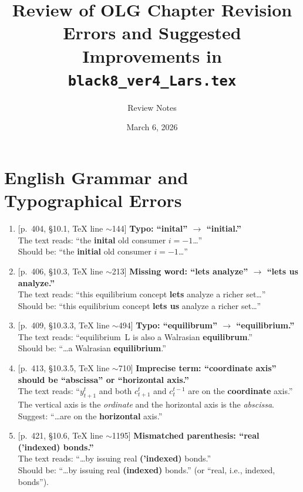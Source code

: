 \documentclass[11pt]{article}
\title{Review of OLG Chapter Revision\\
\large Errors and Suggested Improvements in \texttt{black8\_ver4\_Lars.tex}}
\author{Review Notes}
\date{March 6, 2026}
\newcommand{\Err}[1]{\textbf{\color{red}#1}}
\newcommand{\Fix}[1]{\textbf{\color{green!50!black}#1}}
\newcommand{\loc}[1]{\textsf{\small [#1]}}
\begin{document}
\maketitle

\tableofcontents
\bigskip

\section{English Grammar and Typographical Errors}

\begin{enumerate}[label=\textbf{G\arabic*.}, leftmargin=2em]

\item \loc{p.~404, \S10.1, TeX line $\sim$144}
\textbf{Typo: ``inital'' $\to$ ``initial.''}\\
The text reads: ``the \Err{inital} old consumer $i=-1$\ldots''\\
Should be: ``the \Fix{initial} old consumer $i=-1$\ldots''

\item \loc{p.~406, \S10.3, TeX line $\sim$213}
\textbf{Missing word: ``lets analyze'' $\to$ ``lets us analyze.''}\\
The text reads: ``this equilibrium concept \Err{lets} analyze a richer set\ldots''\\
Should be: ``this equilibrium concept \Fix{lets us} analyze a richer set\ldots''

\item \loc{p.~409, \S10.3.3, TeX line $\sim$494}
\textbf{Typo: ``equilibrum'' $\to$ ``equilibrium.''}\\
The text reads: ``equilibrium~L is also a Walrasian \Err{equilibrum}.''\\
Should be: ``\ldots a Walrasian \Fix{equilibrium}.''

\item \loc{p.~413, \S10.3.5, TeX line $\sim$710}
\textbf{Imprecise term: ``coordinate axis'' should be ``abscissa'' or ``horizontal axis.''}\\
The text reads: ``$y_{t+1}^t$ and both $c_{t+1}^t$ and $c_t^{t-1}$ are on the \Err{coordinate} axis.''\\
The vertical axis is the \emph{ordinate} and the horizontal axis is the \emph{abscissa}. 
Suggest: ``\ldots are on the \Fix{horizontal} axis.''

\item \loc{p.~421, \S10.6, TeX line $\sim$1195}
\textbf{Mismatched parenthesis: ``real ('indexed) bonds.''}\\
The text reads: ``\ldots by issuing real \Err{('indexed)} bonds.''\\
Should be: ``\ldots by issuing real \Fix{(indexed)} bonds.'' (or ``real, i.e., indexed, bonds'').


\end{enumerate}
\end{document}
